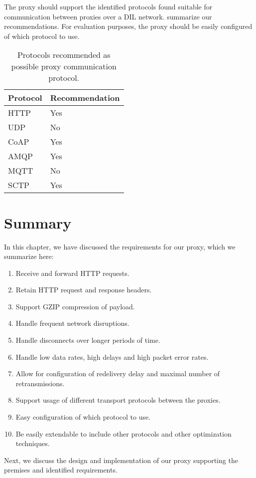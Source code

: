 The proxy should support the identified protocols found suitable for
communication between proxies over a DIL network.
 summarize our recommendations. For
evaluation purposes, the proxy should be easily configured of which protocol to
use.

\begin{table}[h]
\begin{tabularx}{\textwidth}{| X | X |}
\hline
  \textbf{Protocol} & \textbf{Recommendation} \\ \hline
  HTTP & Yes \\ \hline
  UDP & No \\ \hline
  CoAP & Yes \\ \hline
  AMQP & Yes \\ \hline
  MQTT & No \\ \hline
  SCTP & Yes \\ \hline
\end{tabularx}
\caption{Protocols recommended as possible proxy communication protocol.}
\label{table:possible-proxy-protocols}
\end{table}



\section{Summary}
\label{section:requirements-summary}

In this chapter, we have discussed the requirements for our proxy, which we
summarize here:

\begin{enumerate}
    \item Receive and forward HTTP requests.
    \item Retain HTTP request and response headers.
    \item Support GZIP compression of payload.
    \item Handle frequent network disruptions.
    \item Handle disconnects over longer periods of time.
    \item Handle low data rates, high delays and high packet error rates.
    \item Allow for configuration of redelivery delay and maximal number of retransmissions.
    \item Support usage of different transport protocols between the proxies.
    \item Easy configuration of which protocol to use.
    \item Be easily extendable to include other protocols and other optimization techniques.
\end{enumerate}

Next, we discuss the design and implementation of our proxy supporting the
premises and identified requirements.
